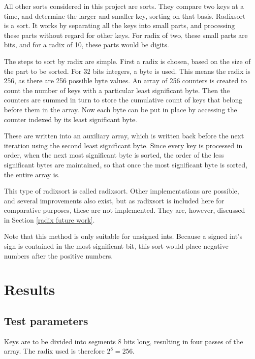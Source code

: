 \label{Radixsort}

All other sorts considered in this project are  sorts.
They compare two keys at a time, and determine the larger and smaller key,
sorting on that basis. Radixsort is a  sort. It works by
separating all the keys into small parts, and processing these parts without
regard for other keys. For radix of two, these small parts are bits, and for a
radix of 10, these parts would be digits. 

The steps to sort by radix are simple. First a radix is chosen, based on the
size of the part to be sorted. For 32 bits integers, a byte is used. This means
the radix is 256, as there are 256 possible byte values. An array of 256
counters is created to count the number of keys with a particular least
significant byte. Then the counters are summed in turn to store the cumulative
count of keys that belong before them in the array. Now each byte can be put in
place by accessing the counter indexed by its least significant byte.

These are written into an auxiliary array, which is written back before the next
iteration using the second least significant byte. Since every key is processed
in order, when the next most significant byte is sorted, the order of the less
significant bytes are maintained, so that once the most significant byte is
sorted, the entire array is.

This type of radixsort is called  radixsort.
Other implementations are possible, and several improvements also exist, but as
radixsort is included here for comparative purposes, these are not implemented.
They are, however, discussed in Section \ref{radix future work}.

Note that this method is only suitable for unsigned ints. Because a signed int's
sign is contained in the most significant bit, this sort would place negative
numbers after the positive numbers.

\section{Results}
\subsection{Test parameters}
Keys are to be divided into segments 8 bits long, resulting in four passes of
the array. The radix used is therefore $2^8 = 256$.

